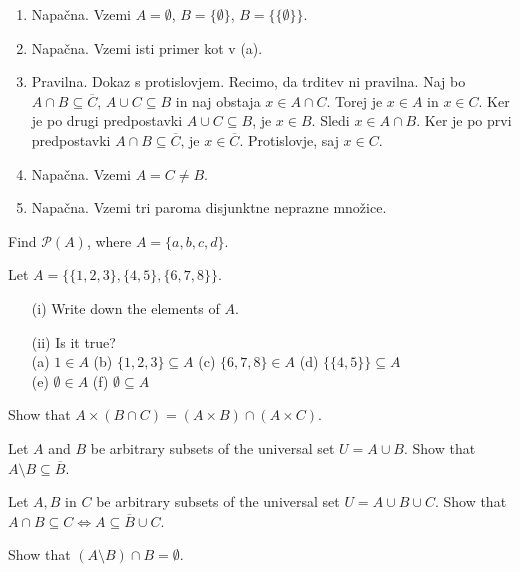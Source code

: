 \documentclass[11pt,paper=b5,footinclude,headinclude]{scrbook} %
\theoremstyle{remark}
\theoremstyle{definition} %
\theoremstyle{theorem} %
\newtheorem{ex}{Exercise\hypertarget{sol:\theex}}[chapter]
\begin{document}
\begin{ex}
\begin{sol}
\begin{enumerate}
\item Napačna. Vzemi $A=\emptyset$, $B=\{\emptyset\}$, $B=\{\{\emptyset\}\}$.
\item Napačna. Vzemi isti primer kot v (a).
\item Pravilna. Dokaz s protislovjem. Recimo, da trditev ni pravilna. Naj bo $A\cap B\subseteq \overline{C}$, $A\cup C\subseteq B$  in naj obstaja $x\in A\cap C$. Torej je $x\in A$ in $x\in C$. Ker je po drugi predpostavki $A\cup C\subseteq B$, je $x\in B$. Sledi $x\in A \cap B$. Ker je po prvi predpostavki $A\cap B\subseteq \overline{C}$, je $x\in \overline{C}$. Protislovje, saj $x\in C$. 
\item Napačna. Vzemi $A=C\neq B$.
\item Napačna. Vzemi tri paroma disjunktne neprazne množice.
\end{enumerate}

\end{sol}
\end{ex} \begin{ex}Find $\mathcal{P}(A)$, where $A=\{a,b,c,d\}$.

\end{ex} \begin{ex}Let $A=\{\{1,2,3\}, \{4,5\}, \{6,7,8\}\}$.
\begin{enumerate}
\item[(i)] Write down the elements of  $A$.
\item[(ii)] Is it true?\\
 (a) $1\in A$ \quad (b) $\{1,2,3\}\subseteq A$ \quad (c)  $\{6,7,8\}\in  A$ \quad  (d)  $\{\{4,5\}\}\subseteq A$\\
  (e) $\emptyset\in A$ \quad(f) $\emptyset\subseteq A$
\end{enumerate}


\end{ex} 
\begin{ex} Show that $A\times (B\cap C) = (A\times B)\cap (A\times C)$.

\end{ex} 

\begin{ex}
    Let $A$ and $B$ be arbitrary subsets of the universal set $U= A \cup B$. Show that $A\setminus B \subseteq \overline{B}$.
\end{ex}
\begin{ex}
    Let $A, B$ in $C$ be arbitrary subsets of the universal set $U= A \cup B \cup C$. Show that $A\cap B \subseteq C \Leftrightarrow A\subseteq \overline{B} \cup C$.
\end{ex}
\begin{ex}
    Show that $(A\setminus B)\cap B = \emptyset $.
\end{ex}
\end{document}
